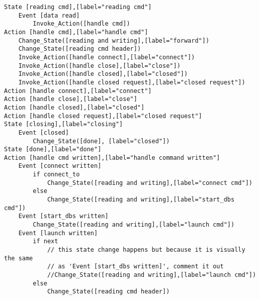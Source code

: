 \begin{verbatim}
State [reading cmd],[label="reading cmd"]
	Event [data read]
		Invoke_Action([handle cmd])
Action [handle cmd],[label="handle cmd"]
	Change_State([reading and writing],[label="forward"])
	Change_State([reading cmd header])
	Invoke_Action([handle connect],[label="connect"])
	Invoke_Action([handle close],[label="close"])
	Invoke_Action([handle closed],[label="closed"])
	Invoke_Action([handle closed request],[label="closed request"])
Action [handle connect],[label="connect"]
Action [handle close],[label="close"]
Action [handle closed],[label="closed"]
Action [handle closed request],[label="closed request"]
State [closing],[label="closing"]
	Event [closed]
		Change_State([done], [label="closed"])
State [done],[label="done"]
Action [handle cmd written],[label="handle command written"]
	Event [connect written]
		if connect_to
			Change_State([reading and writing],[label="connect cmd"])
		else
			Change_State([reading and writing],[label="start_dbs cmd"])
	Event [start_dbs written]
		Change_State([reading and writing],[label="launch cmd"])
	Event [launch written]
		if next
			// this state change happens but because it is visually the same
			// as 'Event [start_dbs written]', comment it out
			//Change_State([reading and writing],[label="launch cmd"])
		else
			Change_State([reading cmd header])
\end{verbatim}
